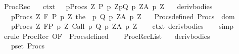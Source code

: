 \begin{isabellebody}
\endisatagproof
{\isafoldproof}%
%
\isadelimproof
\isanewline
%
\endisadelimproof
\isanewline
{}\isamarkupfalse%
\ ProcRec{\isacharprime}{\isacharcolon}\isanewline
\ \ \ ctxt{\isacharcolon}\ {\isachardoublequoteopen}{\isasymTheta}{\isacharprime}\ {\isacharequal}\ {\isasymTheta}{\isasymunion}{\isacharparenleft}{\isasymUnion}p{\isasymin}Procs{\isachardot}\ {\isasymUnion}Z{\isachardot}\ {\isacharbraceleft}{\isacharparenleft}P\ p\ Z{\isacharcomma}p{\isacharcomma}Q\ p\ Z{\isacharcomma}A\ p\ Z{\isacharparenright}{\isacharbraceright}{\isacharparenright}{\isachardoublequoteclose}\isanewline
\ \ \ deriv{\isacharunderscore}bodies{\isacharcolon}\ \ \isanewline
\ \ \ {\isachardoublequoteopen}{\isasymforall}p{\isasymin}Procs{\isachardot}\ {\isasymforall}Z{\isachardot}\ {\isasymGamma}{\isacharcomma}{\isasymTheta}{\isacharprime}{\isasymturnstile}\isactrlbsub {\isacharslash}F\isactrlesub \ {\isacharparenleft}P\ p\ Z{\isacharparenright}\ {\isacharparenleft}the\ {\isacharparenleft}{\isasymGamma}\ p{\isacharparenright}{\isacharparenright}\ {\isacharparenleft}Q\ p\ Z{\isacharparenright}{\isacharcomma}{\isacharparenleft}A\ p\ Z{\isacharparenright}{\isachardoublequoteclose}\isanewline
\ \ \ Procs{\isacharunderscore}defined{\isacharcolon}\ {\isachardoublequoteopen}Procs\ {\isasymsubseteq}\ dom\ {\isasymGamma}{\isachardoublequoteclose}\isanewline
\ \ \ {\isachardoublequoteopen}{\isasymforall}p{\isasymin}Procs{\isachardot}\ {\isasymforall}Z{\isachardot}\ {\isasymGamma}{\isacharcomma}{\isasymTheta}{\isasymturnstile}\isactrlbsub {\isacharslash}F\isactrlesub {\isacharparenleft}P\ p\ Z{\isacharparenright}\ Call\ p\ {\isacharparenleft}Q\ p\ Z{\isacharparenright}{\isacharcomma}{\isacharparenleft}A\ p\ Z{\isacharparenright}{\isachardoublequoteclose}\isanewline
%
\isadelimproof
\ \ %
\endisadelimproof
%
\isatagproof
{}\isamarkupfalse%
\ ctxt\ deriv{\isacharunderscore}bodies\isanewline
\ \ \isamarkupfalse%
\ simp\isanewline
\ \ \isamarkupfalse%
\ {\isacharparenleft}erule\ ProcRec\ {\isacharbrackleft}OF\ {\isacharunderscore}\ Procs{\isacharunderscore}defined{\isacharbrackright}{\isacharparenright}\isanewline
\ \ \isamarkupfalse%
%
\endisatagproof
{\isafoldproof}%
%
\isadelimproof
\isanewline
%
\endisadelimproof
\isanewline
\isanewline
{}\isamarkupfalse%
\ ProcRecList{\isacharcolon}\isanewline
\ \ \ deriv{\isacharunderscore}bodies{\isacharcolon}\ \ \isanewline
\ \ \ {\isachardoublequoteopen}{\isasymforall}p{\isasymin}set\ Procs{\isachardot}\ \isanewline

\end{isabellebody}
